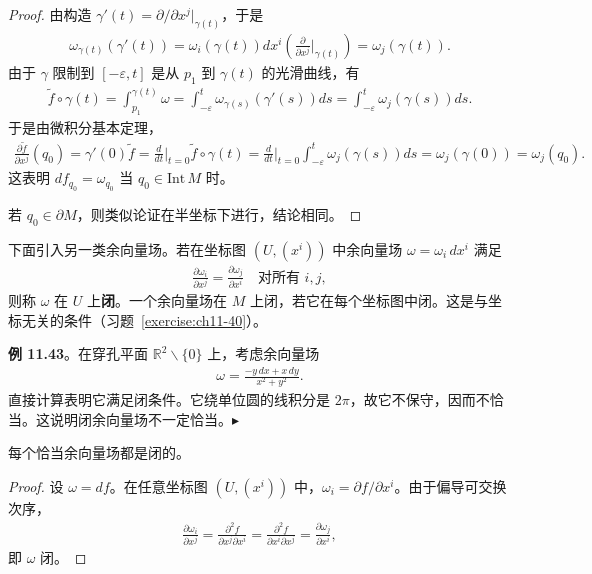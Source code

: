 \documentclass[../../main.tex]{subfiles}
\begin{document}
\begin{proof}
由构造 $\gamma'(t)=\partial/\partial x^j|_{\gamma(t)}$，于是
\begin{align*}
\omega_{\gamma(t)}(\gamma'(t))=\omega_i(\gamma(t))dx^i\left(\frac{\partial}{\partial x^j}\bigg|_{\gamma(t)}\right)=\omega_j(\gamma(t)).
\end{align*}
由于 $\gamma$ 限制到 $[-\varepsilon,t]$ 是从 $p_1$ 到 $\gamma(t)$ 的光滑曲线，有
\begin{align*}
\widetilde f\circ\gamma(t)=\int_{p_1}^{\gamma(t)}\omega=\int_{-\varepsilon}^t\omega_{\gamma(s)}(\gamma'(s))ds=\int_{-\varepsilon}^t\omega_j(\gamma(s))ds.
\end{align*}
于是由微积分基本定理，
\begin{align*}
\frac{\partial\widetilde f}{\partial x^j}(q_0)=\gamma'(0)\widetilde f=\frac{d}{dt}\bigg|_{t=0}\widetilde f\circ\gamma(t)
=\frac{d}{dt}\bigg|_{t=0}\int_{-\varepsilon}^t\omega_j(\gamma(s))ds=\omega_j(\gamma(0))=\omega_j(q_0).
\end{align*}
这表明 $df_{q_0}=\omega_{q_0}$ 当 $q_0\in\mathrm{Int}\,M$ 时。

若 $q_0\in\partial M$，则类似论证在半坐标下进行，结论相同。
\end{proof}

下面引入另一类余向量场。若在坐标图 $(U,(x^i))$ 中余向量场 $\omega=\omega_i\,dx^i$ 满足
\begin{align}
\frac{\partial\omega_i}{\partial x^j}=\frac{\partial\omega_j}{\partial x^i}\quad\text{对所有 }i,j,\label{align:ch11-闭条件}
\end{align}
则称 $\omega$ 在 $U$ 上\textbf{闭}。一个余向量场在 $M$ 上闭，若它在每个坐标图中闭。这是与坐标无关的条件（习题~\ref{exercise:ch11-40}）。

\textbf{例 11.43}。在穿孔平面 $\mathbb{R}^2\smallsetminus\{0\}$ 上，考虑余向量场
\begin{align*}
\omega=\frac{-y\,dx+x\,dy}{x^2+y^2}.
\end{align*}
直接计算表明它满足闭条件。它绕单位圆的线积分是 $2\pi$，故它不保守，因而不恰当。这说明闭余向量场不一定恰当。$\blacktriangleright$

\begin{proposition}\label{proposition:ch11-恰当蕴含闭}
每个恰当余向量场都是闭的。
\end{proposition}

\begin{proof}
设 $\omega=df$。在任意坐标图 $(U,(x^i))$ 中，$\omega_i=\partial f/\partial x^i$。由于偏导可交换次序，
\begin{align*}
\frac{\partial\omega_i}{\partial x^j}=\frac{\partial^2 f}{\partial x^j\partial x^i}=\frac{\partial^2 f}{\partial x^i\partial x^j}=\frac{\partial\omega_j}{\partial x^i},
\end{align*}
即 $\omega$ 闭。
\end{proof}
\end{document}

